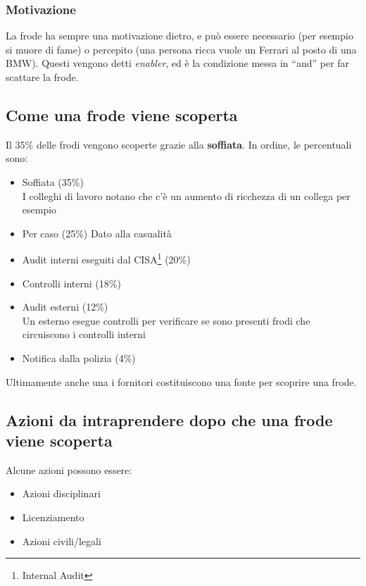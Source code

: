 \subsubsection{Motivazione}

La frode ha sempre una motivazione dietro, e può essere necessario (per esempio
si muore di fame) o percepito (una persona ricca vuole un Ferrari al posto di
una BMW). Questi vengono detti \textit{enabler}, ed è la condizione messa in
``and'' per far scattare la frode.

\subsection{Come una frode viene scoperta}

Il 35\% delle frodi vengono scoperte grazie alla \textbf{soffiata}. In ordine,
le percentuali sono:
\begin{itemize}
  \item Soffiata (35\%) \\
  I colleghi di lavoro notano che c'è un aumento di ricchezza di un collega per
  esempio
  \item Per caso (25\%)
  Dato alla casualità
  \item Audit interni eseguiti dal CISA\footnote{Internal Audit} (20\%)
  \item Controlli interni (18\%)
  \item Audit esterni (12\%) \\
  Un esterno esegue controlli per verificare se sono presenti frodi che
  circuiscono i controlli interni
  \item Notifica dalla polizia (4\%)
\end{itemize}

Ultimamente anche una i fornitori costituiscono una fonte per scoprire una
frode.

\subsection{Azioni da intraprendere dopo che una frode viene scoperta}

Alcune azioni possono essere:
\begin{itemize}
  \item Azioni disciplinari
  \item Licenziamento
  \item Azioni civili/legali
\end{itemize}

